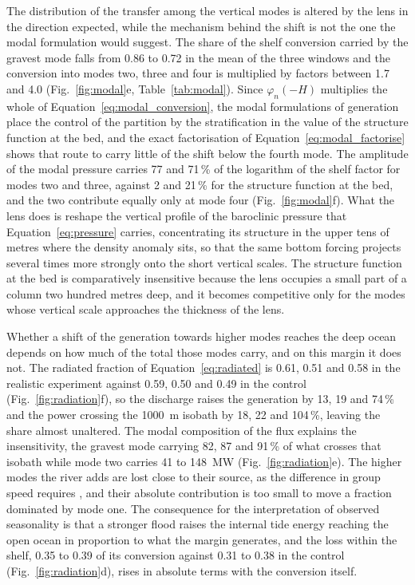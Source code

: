 \documentclass[a4paper,fleqn]{cas-sc}
\begin{document}
The distribution of the transfer among the vertical modes is altered by the lens in the direction expected, while the mechanism behind the shift is not the one the modal formulation would suggest. The share of the shelf conversion carried by the gravest mode falls from 0.86 to 0.72 in the mean of the three windows and the conversion into modes two, three and four is multiplied by factors between 1.7 and 4.0 (Fig.~\ref{fig:modal}e, Table~\ref{tab:modal}). Since $\varphi_{n}(-H)$ multiplies the whole of Equation~\ref{eq:modal_conversion}, the modal formulations of generation \citep{llewellynsmith:2002,griffiths:2007,kelly:2012} place the control of the partition by the stratification in the value of the structure function at the bed, and the exact factorisation of Equation~\ref{eq:modal_factorise} shows that route to carry little of the shift below the fourth mode. The amplitude of the modal pressure carries 77 and 71\,\% of the logarithm of the shelf factor for modes two and three, against 2 and 21\,\% for the structure function at the bed, and the two contribute equally only at mode four (Fig.~\ref{fig:modal}f). What the lens does is reshape the vertical profile of the baroclinic pressure that Equation~\ref{eq:pressure} carries, concentrating its structure in the upper tens of metres where the density anomaly sits, so that the same bottom forcing projects several times more strongly onto the short vertical scales. The structure function at the bed is comparatively insensitive because the lens occupies a small part of a column two hundred metres deep, and it becomes competitive only for the modes whose vertical scale approaches the thickness of the lens.

Whether a shift of the generation towards higher modes reaches the deep ocean depends on how much of the total those modes carry, and on this margin it does not. The radiated fraction of Equation~\ref{eq:radiated} is 0.61, 0.51 and 0.58 in the realistic experiment against 0.59, 0.50 and 0.49 in the control (Fig.~\ref{fig:radiation}f), so the discharge raises the generation by 13, 19 and 74\,\% and the power crossing the 1000~m isobath by 18, 22 and 104\,\%, leaving the share almost unaltered. The modal composition of the flux explains the insensitivity, the gravest mode carrying 82, 87 and 91\,\% of what crosses that isobath while mode two carries 41 to 148~MW (Fig.~\ref{fig:radiation}e). The higher modes the river adds are lost close to their source, as the difference in group speed requires \citep{kelly:2010,kelly:2012,vic2019deep}, and their absolute contribution is too small to move a fraction dominated by mode one. The consequence for the interpretation of observed seasonality is that a stronger flood raises the internal tide energy reaching the open ocean in proportion to what the margin generates, and the loss within the shelf, 0.35 to 0.39 of its conversion against 0.31 to 0.38 in the control (Fig.~\ref{fig:radiation}d), rises in absolute terms with the conversion itself.
\end{document}
